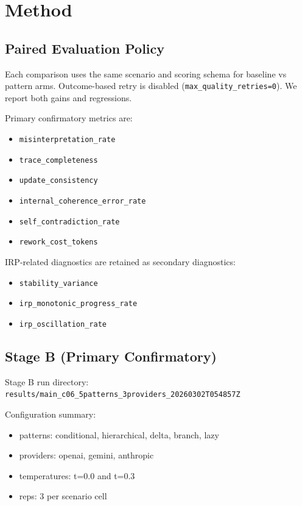 \documentclass[11pt,a4paper]{article}
\begin{document}
\section{Method}
\label{sec:method}

\subsection{Paired Evaluation Policy}

Each comparison uses the same scenario and scoring schema for baseline vs pattern arms. Outcome-based retry is disabled (\texttt{max\_quality\_retries=0}). We report both gains and regressions.

Primary confirmatory metrics are:
\begin{itemize}
  \item \texttt{misinterpretation\_rate}
  \item \texttt{trace\_completeness}
  \item \texttt{update\_consistency}
  \item \texttt{internal\_coherence\_error\_rate}
  \item \texttt{self\_contradiction\_rate}
  \item \texttt{rework\_cost\_tokens}
\end{itemize}

IRP-related diagnostics are retained as secondary diagnostics:
\begin{itemize}
  \item \texttt{stability\_variance}
  \item \texttt{irp\_monotonic\_progress\_rate}
  \item \texttt{irp\_oscillation\_rate}
\end{itemize}

\subsection{Stage B (Primary Confirmatory)}

Stage B run directory:
\texttt{results/main\_c06\_5patterns\_3providers\_20260302T054857Z}

Configuration summary:
\begin{itemize}
  \item patterns: conditional, hierarchical, delta, branch, lazy
  \item providers: openai, gemini, anthropic
  \item temperatures: t=0.0 and t=0.3
  \item reps: 3 per scenario cell
\end{itemize}
\end{document}
